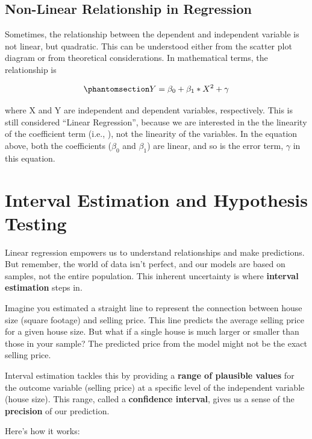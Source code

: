 \documentclass[
  letterpaper,
  paper =a4,
  twoside,
  openright,
  headsepline,
  footsepline,
  listof = totocnumbered,
  chapterprefix = true,
  firstiscover,
  parskip = full*]{scrbook}
\begin{document}
\subsection{Non-Linear Relationship in
Regression}\label{non-linear-relationship-in-regression}

Sometimes, the relationship between the dependent and independent
variable is not linear, but quadratic. This can be understood either
from the scatter plot diagram or from theoretical considerations. In
mathematical terms, the relationship is

\begin{equation}\phantomsection\label{eq-quadratic}{
Y = \beta_0 + \beta_1*X^2 + \gamma
}\end{equation}

where X and Y are independent and dependent variables, respectively.
This is still considered ``Linear Regression'', because we are
interested in the the linearity of the coefficient term (i.e., \beta),
not the linearity of the variables. In the equation above, both the
coefficients (\(\beta_0\) and \(\beta_1\)) are linear, and so is the
error term, \(\gamma\) in this equation.

\section{Interval Estimation and Hypothesis
Testing}\label{interval-estimation-and-hypothesis-testing}

Linear regression empowers us to understand relationships and make
predictions. But remember, the world of data isn't perfect, and our
models are based on samples, not the entire population. This inherent
uncertainty is where \textbf{interval estimation} steps in.

Imagine you estimated a straight line to represent the connection
between house size (square footage) and selling price. This line
predicts the average selling price for a given house size. But what if a
single house is much larger or smaller than those in your sample? The
predicted price from the model might not be the exact selling price.

Interval estimation tackles this by providing a \textbf{range of
plausible values} for the outcome variable (selling price) at a specific
level of the independent variable (house size). This range, called a
\textbf{confidence interval}, gives us a sense of the \textbf{precision}
of our prediction.

Here's how it works:
\end{document}
